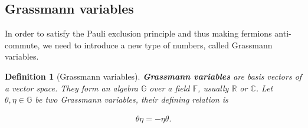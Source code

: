 \documentclass{article}
\theoremstyle{plain} %
\newtheorem{definition}{Definition}[section]
\theoremstyle{convention} %
\theoremstyle{remark} %
\def\df#1{\textbf{\textit{#1}}}
\numberwithin{equation}{section}
\begin{document}
\begin{appendix}

\subsection{Grassmann variables}

\label{sec:grassmann}

In order to satisfy the Pauli exclusion principle and thus making fermions anti-commute, we need to introduce a new type of numbers, called Grassmann variables.

\begin{definition}[Grassmann variables]

\df{Grassmann variables} are basis vectors of a vector space. They form an algebra $\mathbb{G}$ over a field $\mathbb{F}$, usually $\mathbb{R}$ or $\mathbb{C}$. Let $\theta, \eta \in \mathbb{G}$ be two Grassmann variables, their defining relation is

\begin{align*}
    \theta \eta = - \eta \theta.
\end{align*}


\end{definition}
\end{appendix}
\end{document}
